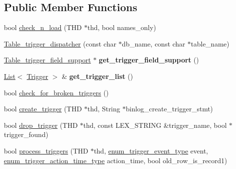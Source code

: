 \subsection*{Public Member Functions}
\begin{DoxyCompactItemize}
\item 
bool \mbox{\hyperlink{classTable__trigger__dispatcher_adf9d213f85728cde8d3844b4b68b6c4a}{check\+\_\+n\+\_\+load}} (T\+HD $\ast$thd, bool names\+\_\+only)
\item 
\mbox{\hyperlink{classTable__trigger__dispatcher_a2b614568870b03e1314d731bcb5b8272}{Table\+\_\+trigger\+\_\+dispatcher}} (const char $\ast$db\+\_\+name, const char $\ast$table\+\_\+name)
\item 
\mbox{\label{classTable__trigger__dispatcher_abecc5a3556156f2695160d9064ea211d}} 
\mbox{\hyperlink{classTable__trigger__field__support}{Table\+\_\+trigger\+\_\+field\+\_\+support}} $\ast$ {\bfseries get\+\_\+trigger\+\_\+field\+\_\+support} ()
\item 
\mbox{\label{classTable__trigger__dispatcher_ac10c8ae9d900330f551227257b6e8d60}} 
\mbox{\hyperlink{classList}{List}}$<$ \mbox{\hyperlink{classTrigger}{Trigger}} $>$ \& {\bfseries get\+\_\+trigger\+\_\+list} ()
\item 
bool \mbox{\hyperlink{classTable__trigger__dispatcher_a61013a61f7bee0179a3ed1eee860299d}{check\+\_\+for\+\_\+broken\+\_\+triggers}} ()
\item 
bool \mbox{\hyperlink{classTable__trigger__dispatcher_ae95758893205106c0bd68e655c40da90}{create\+\_\+trigger}} (T\+HD $\ast$thd, String $\ast$binlog\+\_\+create\+\_\+trigger\+\_\+stmt)
\item 
bool \mbox{\hyperlink{classTable__trigger__dispatcher_a4d0a4d3ee1d736c4c33080985d73b272}{drop\+\_\+trigger}} (T\+HD $\ast$thd, const L\+E\+X\+\_\+\+S\+T\+R\+I\+NG \&trigger\+\_\+name, bool $\ast$trigger\+\_\+found)
\item 
bool \mbox{\hyperlink{classTable__trigger__dispatcher_a3003eef9e85a0ca650bc330c721a23db}{process\+\_\+triggers}} (T\+HD $\ast$thd, \mbox{\hyperlink{trigger__def_8h_a25c92abc3a183d6950b0d9a4ee846e5e}{enum\+\_\+trigger\+\_\+event\+\_\+type}} event, \mbox{\hyperlink{trigger__def_8h_ace20981b1217cca2d3a23e2338fd61b9}{enum\+\_\+trigger\+\_\+action\+\_\+time\+\_\+type}} action\+\_\+time, bool old\+\_\+row\+\_\+is\+\_\+record1)
\item 

\end{DoxyCompactItemize}
